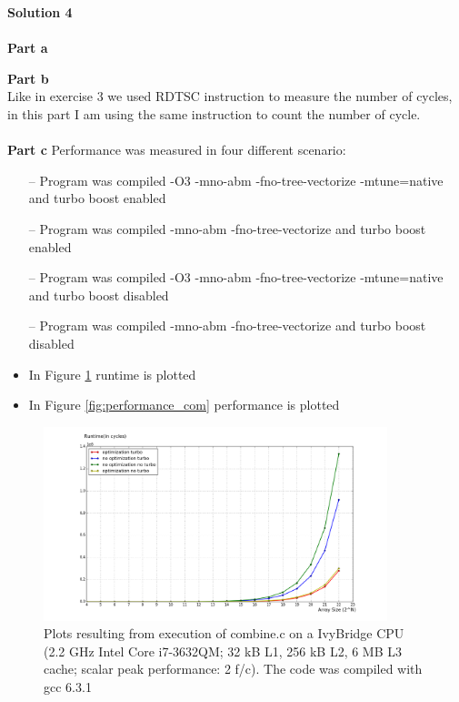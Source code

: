 \documentclass[letterpaper, 11pt]{article}
\begin{document}
\textbf{Solution 4}\\ \\
\textbf{Part a}

\textbf{Part b} \\
Like in exercise 3 we used RDTSC instruction to measure the number of cycles, in this part I am using the same instruction to count the number of cycle. \\ \\
\textbf{Part c} 
Performance was measured in four different scenario:
\begin{itemize}
\item[--] Program was compiled -O3 -mno-abm -fno-tree-vectorize -mtune=native and turbo boost enabled
\item[--] Program was compiled -mno-abm -fno-tree-vectorize and turbo boost enabled
\item[--] Program was compiled -O3 -mno-abm -fno-tree-vectorize -mtune=native and turbo boost disabled
\item[--] Program was compiled -mno-abm -fno-tree-vectorize and turbo boost disabled
\end{itemize}
\begin{itemize}
\item In Figure \ref{fig:runtime_com} runtime is plotted
\item In Figure \ref{fig:performance_com} performance is plotted
\end{itemize}
\begin{figure}[h!]
    \centering
    \includegraphics[width=100mm]{sol_4_1}
    \caption{Plots resulting from execution of combine.c on a IvyBridge CPU (2.2 GHz Intel Core i7-3632QM; 32 kB L1, 256 kB L2, 6 MB L3 cache; scalar peak performance: 2 f/c). The code was compiled with gcc 6.3.1}
    \label{fig:runtime_com}
\end{figure}
\end{document}
